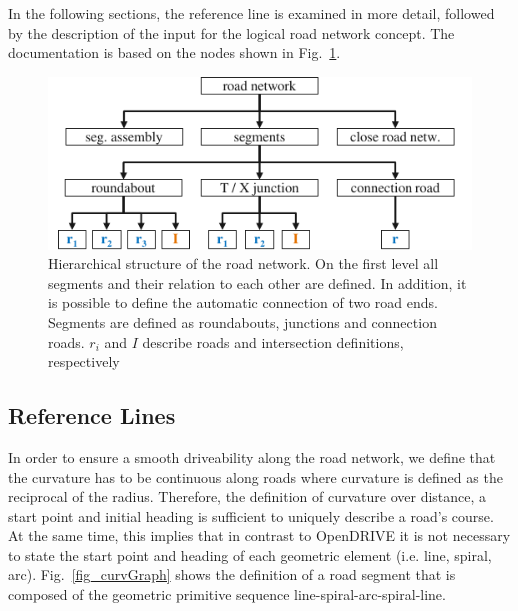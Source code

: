 \documentclass[a4paper, 10pt, conference]{ieeeconf}      %
\begin{document}
In the following sections, the reference line is examined in more detail, followed by the description of the input for the logical road network concept. The documentation is based on the nodes shown in Fig.~\ref{fig_schema}. 
\begin{figure}[thpb] 		
	\centering
	\includegraphics{fig/schema.pdf}
	\caption{Hierarchical structure of the road network. On the first level all segments and their relation to each other are defined. In addition, it is possible to define the automatic connection of two road ends. Segments are defined as roundabouts, junctions and connection roads. $r_i$ and $I$ describe roads and intersection definitions, respectively}
	\label{fig_schema}
\end{figure}
\subsection{Reference Lines} \label{sec_refline} %
In order to ensure a smooth driveability along the road network, we define that the curvature has to be continuous along roads where curvature is defined as the reciprocal of the radius. Therefore, the definition of curvature over distance, a start point and initial heading is sufficient to uniquely describe a road's course. At the same time, this implies that in contrast to OpenDRIVE it is not necessary to state the start point and heading of each geometric element (i.e. line, spiral, arc). Fig.~\ref{fig_curvGraph} shows the definition of a road segment that is composed of the geometric primitive sequence line-spiral-arc-spiral-line.
\end{document}
